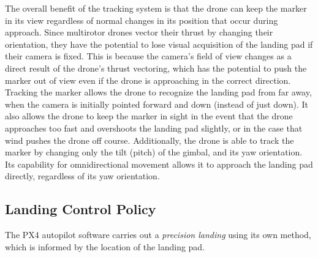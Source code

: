 The overall benefit of the tracking system is that the drone can keep the marker in its view regardless of normal changes in its position that occur during approach.
Since multirotor drones vector their thrust by changing their orientation, they have the potential to lose visual acquisition of the landing pad if their camera is fixed.
This is because the camera's field of view changes as a direct result of the drone's thrust vectoring,
which has the potential to push the marker out of view even if the drone is approaching in the correct direction.
Tracking the marker allows the drone to recognize the landing pad from far away, when the camera is initially pointed forward and down (instead of just down).
It also allows the drone to keep the marker in sight in the event that the drone approaches too fast and overshoots the landing pad slightly, or in the case that wind pushes the drone off course.
Additionally, the drone is able to track the marker by changing only the tilt (pitch) of the gimbal, and its yaw orientation.
Its capability for omnidirectional movement allows it to approach the landing pad directly, regardless of its yaw orientation.

\subsection{Landing Control Policy}

The PX4 autopilot software carries out a \textit{precision landing} using its own method,
which is informed by the location of the landing pad.

